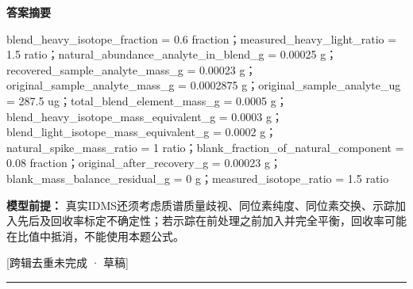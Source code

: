 \documentclass[UTF8,11pt,a4paper]{ctexart}
\begin{document}
\noindent\textbf{答案摘要}\par
blend\_heavy\_isotope\_fraction = 0.6 fraction；measured\_heavy\_light\_ratio = 1.5 ratio；natural\_abundance\_analyte\_in\_blend\_g = 0.00025 g；recovered\_sample\_analyte\_mass\_g = 0.00023 g；original\_sample\_analyte\_mass\_g = 0.0002875 g；original\_sample\_analyte\_ug = 287.5 ug；total\_blend\_element\_mass\_g = 0.0005 g；blend\_heavy\_isotope\_mass\_equivalent\_g = 0.0003 g；blend\_light\_isotope\_mass\_equivalent\_g = 0.0002 g；natural\_spike\_mass\_ratio = 1 ratio；blank\_fraction\_of\_natural\_component = 0.08 fraction；original\_after\_recovery\_g = 0.00023 g；blank\_mass\_balance\_residual\_g = 0 g；measured\_isotope\_ratio = 1.5 ratio\par
\noindent\textbf{模型前提：}
真实IDMS还须考虑质谱质量歧视、同位素纯度、同位素交换、示踪加入先后及回收率标定不确定性；若示踪在前处理之前加入并完全平衡，回收率可能在比值中抵消，不能使用本题公式。\par
\noindent\textcolor{red!65!black}{[跨辑去重未完成 · 草稿]} \par
\medskip\hrule\medskip
{}
\end{document}
